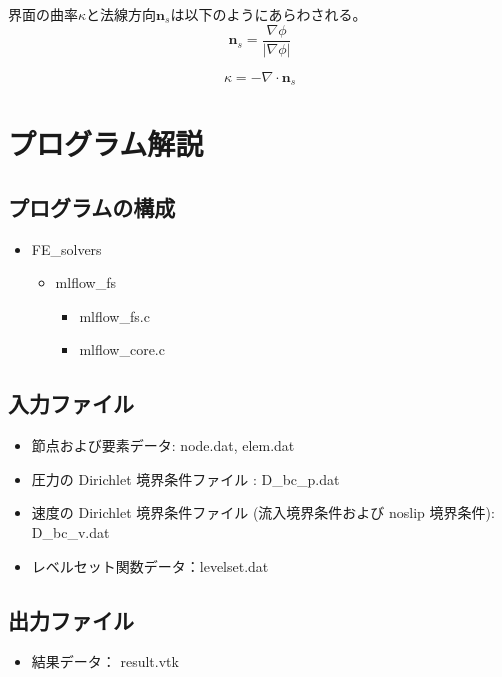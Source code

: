 \documentclass[8pt,a4paper]{article}
\newcommand{\bm}{\boldsymbol}
\begin{document}
界面の曲率$\kappa$と法線方向$\bm{n}_{s}$は以下のようにあらわされる。
\begin{equation}
	\bm{n}_{s} = \frac{\nabla \phi}{| \nabla \phi |}
\end{equation}

\begin{equation}
	\kappa = - \nabla \cdot \bm{n}_{s}
\end{equation}



\section{プログラム解説}
\subsection{プログラムの構成}
\begin{itemize}
 \item FE\_solvers
    \begin{itemize}
      \item mlflow\_fs
      	\begin{itemize}
      		\item mlflow\_fs.c
      		\item mlflow\_core.c
      	\end{itemize}
    \end{itemize}
\end{itemize}

\subsection{入力ファイル}
\begin{itemize}
	\item 節点および要素データ: node.dat, elem.dat
	\item 圧力の Dirichlet 境界条件ファイル : D\_bc\_p.dat
	\item 速度の Dirichlet 境界条件ファイル (流入境界条件および noslip 境界条件): D\_bc\_v.dat
	\item レベルセット関数データ：levelset.dat
\end{itemize}

\subsection{出力ファイル}
\begin{itemize}
	\item 結果データ： result\*.vtk
\end{itemize}
\end{document}
